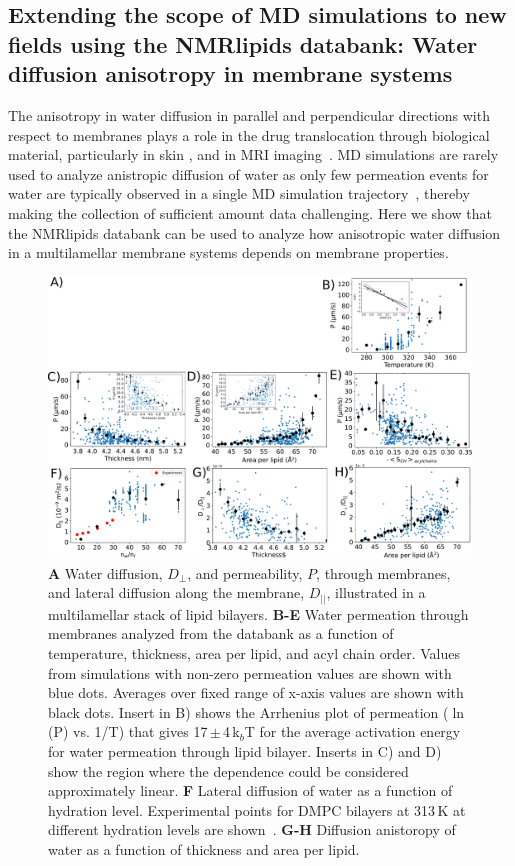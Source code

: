 \documentclass[fleqn,10pt]{wlscirep}
\begin{document}
\subsection{Extending the scope of MD simulations to new fields using the NMRlipids databank: Water diffusion anisotropy in membrane systems}
The anisotropy in water diffusion in parallel and perpendicular directions with respect to membranes plays a role in the drug translocation through biological material, particularly in skin \cite{hansen13,wen18,nitsche19,roberts21}, and in MRI imaging~\cite{topgaard20}. MD simulations are rarely used to analyze anistropic diffusion of water as only few permeation events for water are typically observed in a single MD simulation trajectory~\cite{venable19,camilo2022}, thereby making the collection of sufficient amount data challenging. Here we show that the NMRlipids databank can be used to analyze how anisotropic water diffusion in a multilamellar membrane systems depends on membrane properties. 

\begin{figure}[tb]
    \centering
    \includegraphics[width=180mm]{Figures/permeation2.pdf}
    \caption{{\bf A} Water diffusion, $D_\perp$, and permeability, $P$, through membranes, and lateral diffusion along the membrane, $D_{||}$, illustrated in a multilamellar stack of lipid bilayers. 
    {\bf B-E} Water permeation through membranes analyzed from the databank as a function of temperature, thickness, area per lipid, and acyl chain order. Values from simulations with non-zero permeation values are shown with blue dots. Averages over fixed range of x-axis values are shown with black dots. Insert in B) shows the Arrhenius plot of permeation ($\ln$ (P) vs. 1/T) that gives 17\,$\pm$\,4\,k$_b$T for the average activation energy for water permeation through lipid bilayer. Inserts in C) and D) show the region where the dependence could be considered approximately linear.
    {\bf F} Lateral diffusion of water as a function of hydration level. Experimental points for DMPC bilayers at 313\,K at different hydration levels are shown~\cite{rudakova04}.
    {\bf G-H} Diffusion anistoropy of water as a function of thickness and area per lipid. }
    \label{fig:permeability}
\end{figure}
\end{document}
